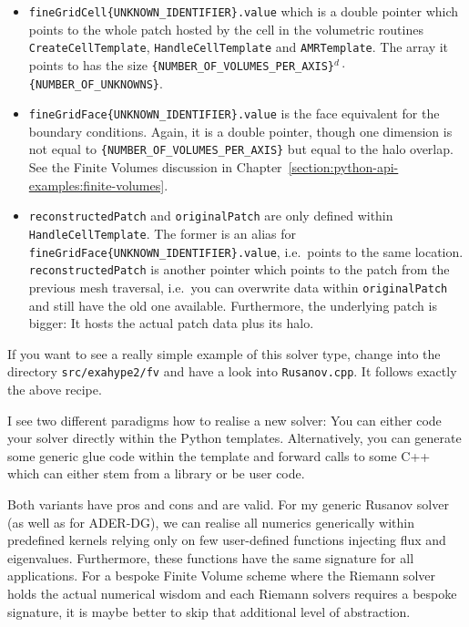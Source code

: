 \begin{itemize}
  \item \texttt{fineGridCell\{UNKNOWN\_IDENTIFIER\}.value} which is a double
    pointer which points to the whole patch hosted by the cell in the volumetric
    routines \texttt{CreateCellTemplate}, \texttt{HandleCellTemplate} and
    \texttt{AMRTemplate}. The array it points to has the size \linebreak
    \texttt{\{NUMBER\_OF\_VOLUMES\_PER\_AXIS\}}$^d \cdot $
    \texttt{\{NUMBER\_OF\_UNKNOWNS\}}.
  \item \texttt{fineGridFace\{UNKNOWN\_IDENTIFIER\}.value} is the face
    equivalent for the boundary conditions. Again, it is a double pointer,
    though one dimension is not equal to
    \texttt{\{NUMBER\_OF\_VOLUMES\_PER\_AXIS\}} but equal to the halo overlap.
    See the Finite Volumes discussion in
    Chapter~\ref{section:python-api-examples:finite-volumes}.
  \item \texttt{reconstructedPatch} and \texttt{originalPatch} are only defined
    within \texttt{HandleCellTemplate}. The former is an alias for
    \texttt{fineGridFace\{UNKNOWN\_IDENTIFIER\}.value}, i.e.~points to the same
    location. \texttt{reconstructedPatch} is another pointer which points to the
    patch from the previous mesh traversal, i.e.~you can overwrite data
    within \texttt{originalPatch} and still have the old one available.
    Furthermore, the underlying patch is bigger: It hosts the actual patch data
    plus its halo.
\end{itemize}




\begin{remark}
 If you want to see a really simple example of this solver type, change into the 
 directory \texttt{src/exahype2/fv} and have a look into \texttt{Rusanov.cpp}.
 It follows exactly the above recipe.
\end{remark}


\noindent
I see two different paradigms how to realise a new solver: 
You can either code your solver directly within the Python templates.
Alternatively, you can generate some generic glue code within the template and
forward calls to some C++ which can either stem from a library or be user
code.


Both variants have pros and cons and are valid.
For my generic Rusanov solver (as well as for ADER-DG), we can realise all
numerics generically within predefined kernels relying only on few user-defined
functions injecting flux and eigenvalues.
Furthermore, these functions have the same signature for all applications.
For a bespoke Finite Volume scheme where the Riemann solver holds the actual
numerical wisdom and each Riemann solvers requires a bespoke signature, it is
maybe better to skip that additional level of abstraction.



